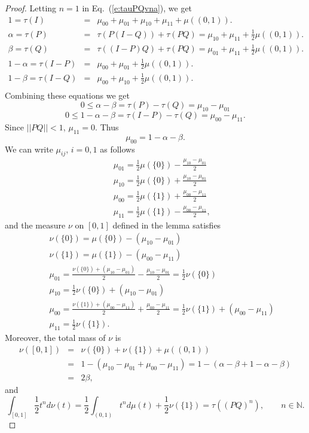 \documentclass{amsart}
\newcommand{\N}{\mathbb N}
\theoremstyle{definition}
\begin{document}
\begin{proof}
Letting $n=1$ in Eq.~(\ref{e:tauPQvna}), we get
\begin{eqnarray*}
1=\tau(I)&=&\mu_{00}+\mu_{01}+\mu_{10}+\mu_{11}+\mu((0,1)).\\
\alpha=\tau(P)&=&\tau(P(I-Q))+\tau(PQ)=\mu_{10}+\mu_{11}+\frac12\mu((0,1)).\\
\beta=\tau(Q)&=&\tau((I-P)Q)+\tau(PQ)=\mu_{01}+\mu_{11}+\frac12\mu((0,1)).\\
1-\alpha=\tau(I-P)&=&\mu_{00}+\mu_{01}+\frac12\mu((0,1)).\\
1-\beta=\tau(I-Q)&=&\mu_{00}+\mu_{10}+\frac12\mu((0,1)).\\
\end{eqnarray*}
Combining these equations we get
$$0\le \alpha-\beta=\tau(P)-\tau(Q)=\mu_{10}-\mu_{01}$$
$$0\le1-\alpha-\beta=\tau(I-P)-\tau(Q)=\mu_{00}-\mu_{11}.$$
Since $||PQ||<1$, $\mu_{11}=0$. Thus
$$ \mu_{00}=1-\alpha-\beta.$$
We can write $\mu_{ij}$, $i=0,1$ as follows
\begin{eqnarray*}
&&\mu_{01}=\frac12\mu(\{0\})-\frac{\mu_{10}-\mu_{01}}{2}\\
&&\mu_{10}=\frac12\mu(\{0\})+\frac{\mu_{10}-\mu_{01}}{2}\\
&&\mu_{00}=\frac12\mu(\{1\})+\frac{\mu_{00}-\mu_{11}}{2}\\
&&\mu_{11}=\frac12\mu(\{1\})-\frac{\mu_{00}-\mu_{11}}{2},
\end{eqnarray*}
and the measure $\nu$ on $[0,1]$ defined in the lemma 
satisfies
\begin{eqnarray}\label{e:mu10relation}
\nonumber&&\nu(\{0\})=\mu(\{0\})-(\mu_{10}-\mu_{01})\\
\nonumber&&\nu(\{1\})=\mu(\{1\})-(\mu_{00}-\mu_{11})\\
\nonumber&&\mu_{01}=\frac{\nu(\{0\})+(\mu_{10}-\mu_{01})}{2}-\frac{\mu_{10}-\mu_{01}}2=\frac12\nu(\{0\})\\
&&\mu_{10}=\frac12\nu(\{0\})+(\mu_{10}-\mu_{01})\\
\nonumber&&\mu_{00}=\frac{\nu(\{1\})+(\mu_{00}-\mu_{11})}{2}+\frac{\mu_{00}-\mu_{11}}{2}=\frac12\nu(\{1\})+(\mu_{00}-\mu_{11})\\
\nonumber&&\mu_{11}=\frac12\nu(\{1\}).
\end{eqnarray}
Moreover, the total mass of $\nu$ is
\begin{eqnarray*}
\nu([0,1])&=&\nu(\{0\})+\nu(\{1\})+\mu((0,1))\\
&=&1-(\mu_{10}-\mu_{01}+\mu_{00}-\mu_{11})= 1-(\alpha-\beta+1-\alpha-\beta)\\
&=&2\beta,
\end{eqnarray*}
and
$$\int_{[0,1]}{\frac12t^n d\nu(t)}=\frac12\int_{(0,1)}t^n d\mu(t)+\frac12\nu(\{1\})=\tau((PQ)^n), \qquad n\in\N.$$
\end{proof}
\end{document}
